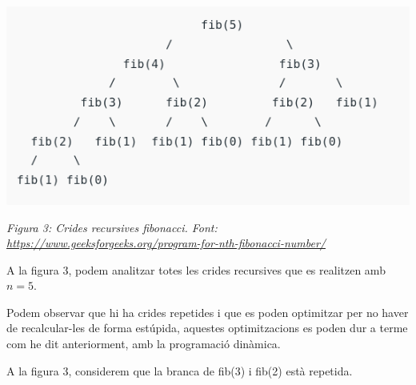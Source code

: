 \begin{center}
\includegraphics[width=.9 \textwidth]{crides.png}

\caption{\emph{Figura 3: Crides recursives fibonacci. Font: \url{https://www.geeksforgeeks.org/program-for-nth-fibonacci-number/}}}
\end{center}

A la figura 3, podem analitzar totes les crides recursives que es realitzen amb $n = 5$.

Podem observar que hi ha crides repetides i que es poden optimitzar per no haver de recalcular-les de forma estúpida, aquestes optimitzacions es poden dur a terme com he dit anteriorment, amb la programació dinàmica. \newline

A la figura 3, considerem que la branca de fib(3) i fib(2) està repetida.